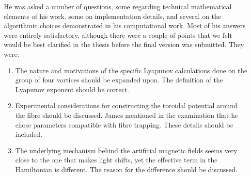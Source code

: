 \documentclass[11pt]{article}
\begin{document}
He was asked a number of questions, some regarding technical mathematical elements of his work, some on implementation details, and several on the algorithmic choices demonstrated in his computational work. Most of his answers were entirely satisfactory, although there were a couple of points that we felt would be best clarified in the thesis before the final version was submitted. They were:

\begin{enumerate}
\item The nature and motivations of the specific Lyapunov calculations done on the group of four vortices should be expanded upon. The definition of the Lyapunov exponent should be correct.

\item Experimental considerations for constructing the toroidal potential around the fibre should be discussed. James mentioned in the examination that he chose parameters compatible with fibre trapping. These details should be included.


\item The underlying mechanism behind the artificial magnetic fields seems very close to the one that makes light shifts, yet the effective term in the Hamiltonian is different. The reason for the difference should be discussed. 

\end{enumerate}
\end{document}

